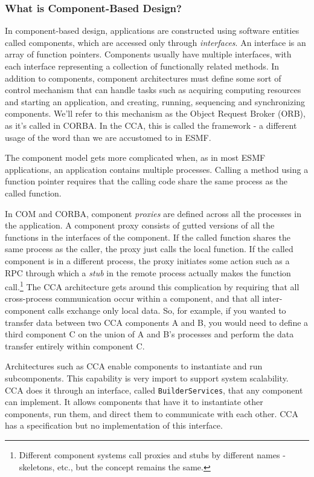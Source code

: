 \subsubsection{What is Component-Based Design?}

In component-based design, applications are constructed using software entities 
called components, which are accessed only through {\it interfaces}.  
An interface is an array of function pointers.  Components usually have multiple 
interfaces, with each interface representing a collection of functionally 
related methods.  In addition to components, component 
architectures must define some sort of control mechanism that can handle tasks 
such as acquiring computing resources and starting an application, 
and creating, running, sequencing and synchronizing components.  We'll refer to
this mechanism as the Object Request Broker (ORB), as it's called in CORBA.  In the 
CCA, this is called the framework - a different usage
of the word than we are accustomed to in ESMF.

The component model gets more complicated when, as in most ESMF applications, 
an application contains multiple processes.  Calling a 
method using a function pointer requires that the calling code share the 
same process as the called function.  

In COM and CORBA, component {\it proxies} are defined across
all the processes in the application.  A component proxy consists of gutted 
versions of all the functions in the interfaces of the component.  If the 
called function shares the same process as the caller, the proxy just 
calls the local function.  If the called component is in a different process, 
the proxy initiates some action such as a RPC through which a {\it stub} in 
the remote process actually makes the function call.\footnote{Different 
component systems call proxies and 
stubs by different names - skeletons, etc., but the concept remains the same.}  
The CCA architecture gets around this complication by 
requiring that all cross-process communication occur within a component, and
that all inter-component calls exchange only local data.  So, for example,
if you wanted to transfer data between two CCA components A and B, you would need 
to define a third component C on the union of A and B's processes and perform
the data transfer entirely within component C.

Architectures such as CCA enable components to instantiate and run 
subcomponents.  This
capability is very import to support system scalability.  CCA does it 
through an interface, called {\tt BuilderServices}, that any component
can implement.  It allows components that have it to instantiate other
components, run them, and direct them to communicate with each other.
CCA has a specification but no implementation of this interface.

